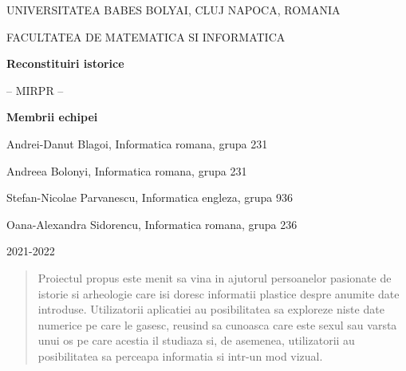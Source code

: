 \documentclass[runningheads,a4paper,11pt]{report}
\begin{document}
\begin{titlepage}
\sloppy

\begin{center}
UNIVERSITATEA BABES BOLYAI, CLUJ NAPOCA, ROMANIA
\end{center}

\begin{center}
FACULTATEA DE MATEMATICA SI INFORMATICA
\end{center}

\begin{center}
\vspace{6cm}

\Huge \textbf{Reconstituiri istorice}

\vspace{1cm}

\normalsize -- MIRPR  --

\end{center}


\vspace{5cm}

\begin{flushright}
\Large{\textbf{Membrii echipei}}
\end{flushright}

\begin{flushright}
Andrei-Danut Blagoi, Informatica romana, grupa 231
\end{flushright}

\begin{flushright}
Andreea Bolonyi, Informatica romana, grupa 231
\end{flushright}

\begin{flushright}
Stefan-Nicolae Parvanescu, Informatica engleza, grupa 936
\end{flushright}

\begin{flushright}
Oana-Alexandra Sidorencu, Informatica romana, grupa 236
\end{flushright}

\vspace{4cm}

\begin{center}
2021-2022
\end{center}

\end{titlepage}


\begin{abstract}
Proiectul propus este menit sa vina in ajutorul persoanelor pasionate de istorie si arheologie care isi doresc informatii plastice despre anumite date introduse. Utilizatorii aplicatiei au posibilitatea sa exploreze niste date numerice pe care le gasesc, reusind sa cunoasca care este sexul sau varsta unui os pe care acestia il studiaza si, de asemenea, utilizatorii au posibilitatea sa perceapa informatia si intr-un mod vizual.
\end{abstract}
\end{document}
